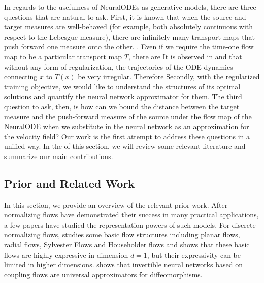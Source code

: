   In regards to the usefulness of NeuralODEs as generative models,
  there are three questions that are natural to ask.
  First, %
  it is known that when the source and target measures are
  well-behaved (for example, both absolutely continuous with respect
  to the Lebesgue measure), there are  infinitely many
  transport maps that push forward one measure onto the other. .
  Even if we require the time-one flow map  to
  be a particular transport map $T$, there are 
  It is observed in \cite{OTFlow} and \cite{HowToTrain} that without
  any form of regularization, the trajectories of the ODE dynamics
  connecting $x$ to $T(x)$  be very
  irregular. %
  Therefore 
  Secondly, with the regularized training objective, we would like to
  understand the structures of its optimal solutions and quantify the
  neural network approximator for them. The third question to ask,
  then, is how can we bound the distance between the target measure
  and the push-forward measure of the source under the flow map of the
  NeuralODE when we substitute in the neural network as an
  approximation for the velocity field? Our work is the first attempt
  to address these questions in a unified way. In the 
  of this section, we will review some relevant literature and
  summarize our main contributions.


\subsection{Prior and Related Work}
In this section, we provide an overview of the  relevant
prior work. After normalizing flows have demonstrated their success in
many practical applications, a few papers have studied the
representation powers of such models. For discrete normalizing flows,
\cite{DisAppro2} studies some basic flow structures including planar
flows, radial flows, Sylvester Flows and Householder flows and shows
that these basic flows are highly expressive in dimension $d = 1$, but
their expressivity can be limited in higher
dimensions. \cite{DisAppro1} shows that invertible neural networks
based on coupling flows are universal approximators for
diffeomorphisms.

